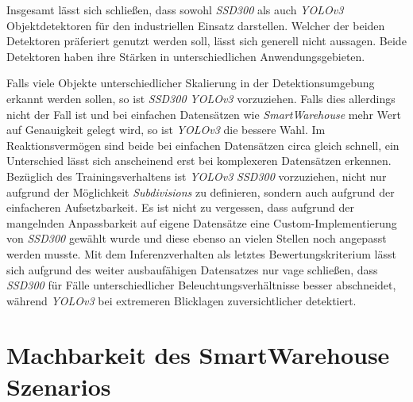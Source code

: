 Insgesamt lässt sich schließen, dass sowohl \textit{SSD300} als auch \textit{YOLOv3} Objektdetektoren für den industriellen Einsatz darstellen. Welcher der beiden Detektoren präferiert genutzt werden soll, lässt sich generell nicht aussagen. Beide Detektoren haben ihre Stärken in unterschiedlichen Anwendungsgebieten. 

Falls viele Objekte unterschiedlicher Skalierung in der Detektionsumgebung erkannt werden sollen, so ist \textit{SSD300} \textit{YOLOv3} vorzuziehen. Falls dies allerdings nicht der Fall ist und bei einfachen Datensätzen wie \textit{SmartWarehouse} mehr Wert auf Genauigkeit gelegt wird, so ist \textit{YOLOv3} die bessere Wahl. Im Reaktionsvermögen sind beide bei einfachen Datensätzen circa gleich schnell, ein Unterschied lässt sich anscheinend erst bei komplexeren Datensätzen erkennen. Bezüglich des Trainingsverhaltens ist \textit{YOLOv3} \textit{SSD300} vorzuziehen, nicht nur aufgrund der Möglichkeit \textit{Subdivisions} zu definieren, sondern auch aufgrund der einfacheren Aufsetzbarkeit. Es ist nicht zu vergessen, dass aufgrund der mangelnden Anpassbarkeit auf eigene Datensätze eine Custom-Implementierung von \textit{SSD300} gewählt wurde und diese ebenso an vielen Stellen noch angepasst werden musste. Mit dem Inferenzverhalten als letztes Bewertungskriterium lässt sich aufgrund des weiter ausbaufähigen Datensatzes nur vage schließen, dass \textit{SSD300} für Fälle unterschiedlicher Beleuchtungsverhältnisse besser abschneidet, während \textit{YOLOv3} bei extremeren Blicklagen zuversichtlicher detektiert. 

\section{Machbarkeit des SmartWarehouse Szenarios}

